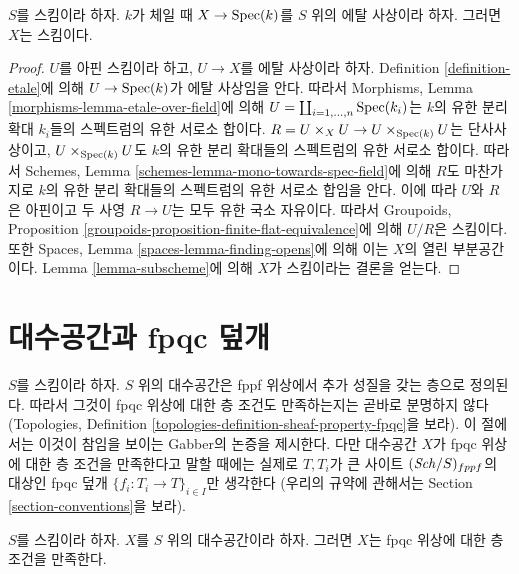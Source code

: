 \begin{lemma}
\label{lemma-etale-over-field-scheme}
$S$를 스킴이라 하자. $k$가 체일 때 $X \to \mathop{\mathrm{Spec}}(k)$를
$S$ 위의 에탈 사상이라 하자.
그러면 $X$는 스킴이다.
\end{lemma}

\begin{proof}
$U$를 아핀 스킴이라 하고, $U \to X$를 에탈 사상이라 하자.
Definition \ref{definition-etale}에 의해 $U \to \mathop{\mathrm{Spec}}(k)$가
에탈 사상임을 안다. 따라서 Morphisms, Lemma
\ref{morphisms-lemma-etale-over-field}에 의해
$U = \coprod_{i = 1, \ldots, n} \mathop{\mathrm{Spec}}(k_i)$는 $k$의 유한 분리 확대
$k_i$들의 스펙트럼의 유한 서로소 합이다.
$R = U \times_X U \to U \times_{\mathop{\mathrm{Spec}}(k)} U$는 단사사상이고,
$U \times_{\mathop{\mathrm{Spec}}(k)} U$도 $k$의 유한 분리 확대들의 스펙트럼의
유한 서로소 합이다. 따라서 Schemes, Lemma
\ref{schemes-lemma-mono-towards-spec-field}에 의해 $R$도 마찬가지로
$k$의 유한 분리 확대들의 스펙트럼의 유한 서로소 합임을 안다.
이에 따라 $U$와 $R$은 아핀이고 두 사영 $R \to U$는 모두
유한 국소 자유이다. 따라서 Groupoids, Proposition
\ref{groupoids-proposition-finite-flat-equivalence}에 의해
$U/R$은 스킴이다. 또한 Spaces, Lemma
\ref{spaces-lemma-finding-opens}에 의해 이는 $X$의 열린 부분공간이다.
Lemma \ref{lemma-subscheme}에 의해 $X$가 스킴이라는 결론을 얻는다.
\end{proof}

\section{대수공간과 fpqc 덮개}
\label{section-fpqc}

\noindent
$S$를 스킴이라 하자.
$S$ 위의 대수공간은 fppf 위상에서 추가 성질을 갖는 층으로 정의된다.
따라서 그것이 fpqc 위상에 대한 층 조건도 만족하는지는 곧바로
분명하지 않다(Topologies, Definition
\ref{topologies-definition-sheaf-property-fpqc}을 보라).
이 절에서는 이것이 참임을 보이는 Gabber의 논증을 제시한다.
다만 대수공간 $X$가 fpqc 위상에 대한 층 조건을 만족한다고 말할 때에는
실제로 $T, T_i$가 큰 사이트 $(\mathit{Sch}/S)_{fppf}$의 대상인
fpqc 덮개 $\{f_i : T_i \to T\}_{i \in I}$만 생각한다
(우리의 규약에 관해서는 Section \ref{section-conventions}을 보라).

\begin{proposition}[Gabber]
\label{proposition-sheaf-fpqc}
$S$를 스킴이라 하자. $X$를 $S$ 위의 대수공간이라 하자.
그러면 $X$는 fpqc 위상에 대한 층 조건을 만족한다.
\end{proposition}

